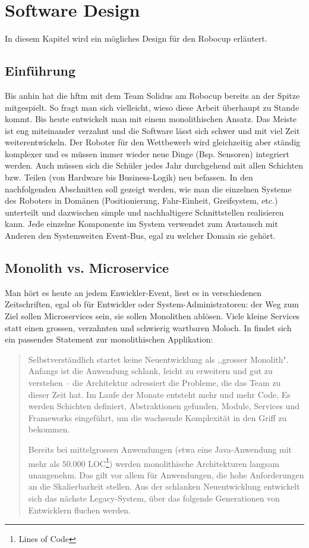 \chapter{Software Design}
\label{chap:software-design}
In diesem Kapitel wird ein mögliches Design für den Robocup erläutert.
\section{Einführung}
Bis anhin hat die \acrshort{hftm} mit dem Team Solidus am Robocup bereits an der Spitze mitgespielt. So fragt man sich vielleicht, wieso diese Arbeit überhaupt zu Stande kommt. Bis heute entwickelt man mit einem monolithischen Ansatz. Das Meiste ist eng miteinander verzahnt und die Software lässt sich schwer und mit viel Zeit weiterentwickeln. Der Roboter für den Wettbewerb wird gleichzeitig aber ständig komplexer und es müssen immer wieder neue Dinge (Bsp. Sensoren) integriert werden. Auch müssen sich die Schüler jedes Jahr durchgehend mit allen Schichten bzw. Teilen (von Hardware bis Business-Logik) neu befassen. In den nachfolgenden Abschnitten soll gezeigt werden, wie man die einzelnen Systeme des Roboters in Domänen (Positionierung, Fahr-Einheit, Greifsystem, etc.) unterteilt und dazwischen simple und nachhaltigere Schnittstellen realisieren kann.
Jede einzelne Komponente im System verwendet zum Austausch mit Anderen den Systemweiten Event-Bus, egal zu welcher Domain sie gehört.

\section{Monolith vs. Microservice}
Man hört es heute an jedem Enwickler-Event, liest es in verschiedenen Zeitschriften, egal ob für Entwickler oder System-Administratoren: der Weg zum Ziel sollen Microservices sein, sie sollen Monolithen ablösen. Viele kleine Services statt einen grossen, verzahnten und schwierig wartbaren Moloch. 
In \cite{informatik-aktuell-microservices} findet sich ein passendes Statement zur monolithischen Applikation:
\begin{quote}
	Selbstverständlich startet keine Neuentwicklung als ,,grosser Monolith". Anfangs ist die Anwendung schlank, leicht zu erweitern und gut zu verstehen – die Architektur adressiert die Probleme, die das Team zu dieser Zeit hat. Im Laufe der Monate entsteht mehr und mehr Code. Es werden Schichten definiert, Abstraktionen gefunden, Module, Services und Frameworks eingeführt, um die wachsende Komplexität in den Griff zu bekommen.
	
	Bereits bei mittelgrossen Anwendungen (etwa eine Java-Anwendung mit mehr als 50.000 LOC\footnote{Lines of Code}) werden monolithische Architekturen langsam unangenehm. Das gilt vor allem für Anwendungen, die hohe Anforderungen an die Skalierbarkeit stellen. Aus der schlanken Neuentwicklung entwickelt sich das nächste Legacy-System, über das folgende Generationen von Entwicklern fluchen werden.
\end{quote}
